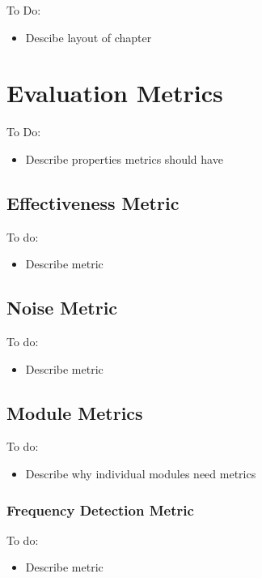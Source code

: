 
\color{red}
To Do:
\begin{itemize}
	\item Descibe layout of chapter
\end{itemize}
\color{black}

\section{Evaluation Metrics}

\color{red}
To Do:
\begin{itemize}
	\item Describe properties metrics should have
\end{itemize}
\color{black}

\subsection{Effectiveness Metric}

\color{red}
To do:
\begin{itemize}
	\item Describe metric
\end{itemize}
\color{black}

\subsection{Noise Metric}

\color{red}
To do:
\begin{itemize}
	\item Describe metric
\end{itemize}
\color{black}

\subsection{Module Metrics}

\color{red}
To do:
\begin{itemize}
	\item Describe why individual modules need metrics
\end{itemize}
\color{black}

\subsubsection{Frequency Detection Metric}

\color{red}
To do:
\begin{itemize}
	\item Describe metric
\end{itemize}
\color{black}


